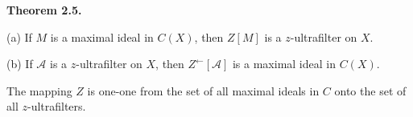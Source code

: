 \textbf{Theorem 2.5.}

(a) If $M$ is a maximal ideal in $C(X)$, then $Z[M]$ is a $z$-ultrafilter on $X$.

(b) If $\mathcal{A}$ is a $z$-ultrafilter on $X$, then $Z^{\leftarrow}[\mathcal{A}]$ is a maximal ideal in $C(X)$.

The mapping $Z$ is one-one from the set of all maximal ideals in $C$ onto the set of all $z$-ultrafilters.
